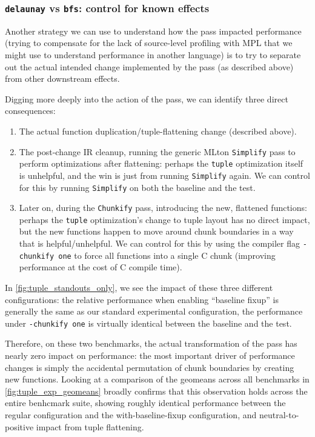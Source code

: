 \documentclass[leqno,11pt]{article}
\begin{document}
\subsubsection{\texttt{delaunay} vs \texttt{bfs}: control for known effects}
Another strategy we can use to understand how the pass impacted performance
(trying to compensate for the lack of source-level profiling with MPL that we
might use to understand performance in another language) is to try to separate
out the actual intended change implemented by the pass (as described above) from
other downstream effects.

Digging more deeply into the action of the pass, we can identify three direct
consequences:
\begin{enumerate}
\item The actual function duplication/tuple-flattening change (described above).

\item The post-change IR cleanup, running the generic MLton \texttt{Simplify}
  pass to perform optimizations after flattening: perhaps the \texttt{tuple}
  optimization itself is unhelpful, and the win is just from running
  \texttt{Simplify} again. We can control for this by running \texttt{Simplify}
  on both the baseline and the test.

\item Later on, during the \texttt{Chunkify} pass, introducing the new,
  flattened functions: perhaps the \texttt{tuple} optimization's change to tuple
  layout has no direct impact, but the new functions happen to move around chunk
  boundaries in a way that is helpful/unhelpful. We can control for this by
  using the compiler flag \texttt{-chunkify one} to force all functions into a
  single C chunk (improving performance at the cost of C compile time).

\end{enumerate}

In \cref{fig:tuple_standouts_only}, we see the impact of these three different
configurations: the relative performance when enabling ``baseline fixup'' is
generally the same as our standard experimental configuration, the performance
under \texttt{-chunkify one} is virtually identical between the baseline and the
test.

Therefore, on these two benchmarks, the actual transformation of the pass has
nearly zero impact on performance: the most important driver of performance
changes is simply the accidental permutation of chunk boundaries by creating new
functions. Looking at a comparison of the geomeans across all benchmarks in
\cref{fig:tuple_exp_geomeans} broadly confirms that this observation holds
across the entire benhcmark suite, showing roughly identical performance between
the regular configuration and the with-baseline-fixup configuration, and
neutral-to-positive impact from tuple flattening.
\end{document}
